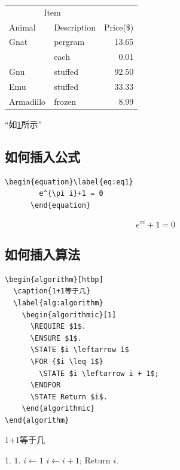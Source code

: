        \begin{table}[htpb]
          \centering
          \label{tab:1st}
          \begin{tabular}{@{}llr@{}}
            \toprule
            \multicolumn{2}{c}{Item} & \\
            \cmidrule(r){1-2}
            Animal    & Description  & Price(\$) \\
            \midrule
            Gnat      & pergram      & 13.65 \\
            & each         & 0.01 \\
            Gnu       & stuffed      & 92.50 \\
            Emu       & stuffed      & 33.33 \\
            Armadillo & frozen       & 8.99 \\
            \bottomrule
          \end{tabular}
        \end{table}

“如\cref{tab:1st}所示”


\subsection{如何插入公式}

\begin{center}
  \begin{minipage}{0.85\textwidth}
    \begin{Verbatim}[frame=single]
      \begin{equation}\label{eq:eq1}
        e^{\pi i}+1 = 0
      \end{equation}
    \end{Verbatim}
  \end{minipage}
\end{center}

      \begin{equation}\label{eq:eq1}
        e^{\pi i}+1 = 0
      \end{equation}

\subsection{如何插入算法}

\begin{center}
  \begin{minipage}{0.85\textwidth}
    \begin{Verbatim}[frame=single]
\begin{algorithm}[htbp]
  \caption{1+1等于几}
  \label{alg:algorithm}
    \begin{algorithmic}[1]
      \REQUIRE $1$.
      \ENSURE $1$.
      \STATE $i \leftarrow 1$
      \FOR {$i \leq 1$}
        \STATE $i \leftarrow i + 1$;
      \ENDFOR
      \STATE Return $i$.
    \end{algorithmic}
\end{algorithm}
    \end{Verbatim}
  \end{minipage}
\end{center}

\begin{algorithm}[htbp]
\caption{1+1等于几}
\label{alg:algorithm}
\begin{algorithmic}[1]
\REQUIRE $1$.
\ENSURE $1$.
\STATE $i \leftarrow 1$
\STATE $i \leftarrow i + 1$;
\ENDFOR
\STATE Return $i$.
\end{algorithmic}
\end{algorithm}
